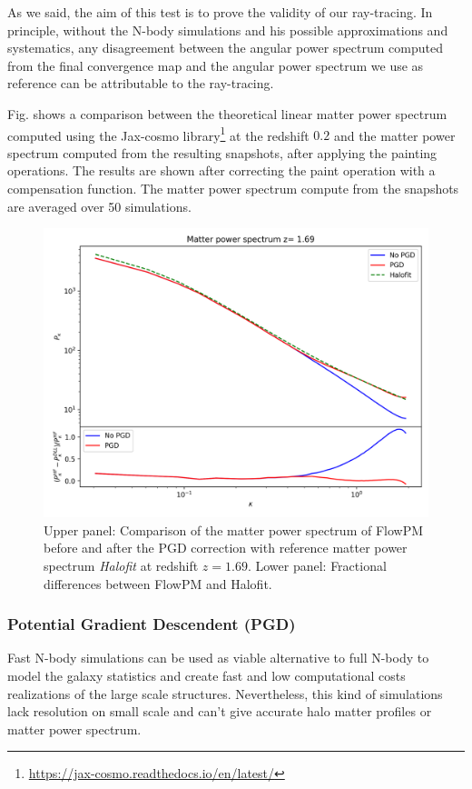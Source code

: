 \documentclass[twocolumn,twocolappendix]{aastex63}
\begin{document}
As we said, the aim of this test is to prove the validity of our ray-tracing. In principle, without the N-body simulations and his possible approximations and systematics, any disagreement between the angular power spectrum computed from the final convergence map
and the angular power spectrum we use as reference can be attributable to the ray-tracing.

Fig. shows a comparison between the theoretical linear matter power spectrum computed using the Jax-cosmo library\footnote{\url{https://jax-cosmo.readthedocs.io/en/latest/}} at the redshift $0.2$ and the matter power spectrum computed from the resulting snapshots, after applying the painting operations. The results are shown after correcting the paint operation with a compensation function. The matter power spectrum compute from the snapshots are averaged over 50 simulations.  
\begin{figure}
    \centering
    \includegraphics{paper/figures/pkhalofit_comp.png}
    \caption{
    Upper panel: Comparison of the matter power spectrum of FlowPM before and after the PGD correction with reference matter power spectrum \textit{Halofit} at redshift $z = 1.69$. Lower panel: Fractional differences between FlowPM and Halofit.
    }
    \label{fig:pklinear_comp}
\end{figure}



\subsubsection{Potential Gradient Descendent (PGD)}    
Fast N-body simulations can be used as viable alternative to full N-body to model the galaxy statistics and create fast and low computational costs realizations of the large scale structures. Nevertheless, this kind of simulations lack resolution on small scale and can't give accurate halo matter profiles or matter power spectrum. 
\end{document}

